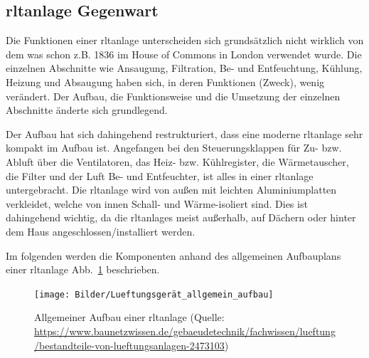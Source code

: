 \subsection{\ac{rltanlage} Gegenwart}
Die Funktionen einer \ac{rltanlage} unterscheiden sich grundsätzlich nicht wirklich von dem was schon z.B. 1836 im House of Commons in London verwendet wurde. Die einzelnen Abschnitte wie \zB Ansaugung, Filtration, Be- und Entfeuchtung, Kühlung, Heizung und Absaugung haben sich, in deren Funktionen (Zweck), wenig verändert. Der Aufbau, die Funktionsweise und die Umsetzung der einzelnen Abschnitte änderte sich  grundlegend.

Der Aufbau hat sich dahingehend restrukturiert, dass eine moderne \ac{rltanlage} sehr kompakt im Aufbau ist. Angefangen bei den Steuerungsklappen für Zu- bzw. Abluft über die Ventilatoren, das Heiz- bzw. Kühlregister, die Wärmetauscher, die Filter und der Luft Be- und Entfeuchter, ist alles in einer \ac{rltanlage} untergebracht.
Die \ac{rltanlage} wird von außen mit leichten Aluminiumplatten verkleidet, welche von innen Schall- und Wärme-isoliert sind. Dies ist dahingehend wichtig, da die \acp{rltanlage} meist außerhalb, \zB auf Dächern oder hinter dem Haus angeschlossen/installiert werden. 

Im folgenden werden die Komponenten anhand des allgemeinen Aufbauplans einer \ac{rltanlage} Abb.~\ref{fig:Aufbau_Lueftungsgerät_allgemein} beschrieben. 

\begin{figure}[H]
	\centering
	\texttt{[image: Bilder/Lueftungsgerät\_allgemein\_aufbau]}
	\caption{Allgemeiner Aufbau einer \ac{rltanlage} (Quelle: \url{https://www.baunetzwissen.de/gebaeudetechnik/fachwissen/lueftung/bestandteile-von-lueftungsanlagen-2473103})}
	\label{fig:Aufbau_Lueftungsgerät_allgemein}
\end{figure}

